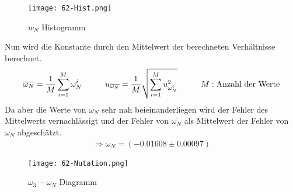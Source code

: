 \begin{figure}[ht]
    \centering
    \caption{$w_N$ Histogramm}
    \texttt{[image: 62-Hist.png]}
\end{figure}
Nun wird die Konstante durch den Mittelwert der berechneten Verhältnisse berechnet.
\begin{align}   
    \overline{\omega_N} = \frac{1}{M}\sum_{i=1}^{M}\omega_N^i \tab u_{\overline{\omega_N}}= \frac{1}{M}\sqrt{\sum_{i=1}^{M}u_{\omega_N^i}^2} \tab M:\text{Anzahl der Werte}
\end{align}
Da aber die Werte von $\omega_N$ sehr nah beieinanderliegen wird der Fehler des Mittelwerts vernachlässigt und der Fehler von $\overline{\omega_N}$ als Mittelwert der Fehler von $\omega_N$ abgeschätzt.
\begin{align*}
    \Rightarrow\boxed{\overline{\omega_N}=(-0.01608\pm0.00097)}
\end{align*}
\newpage
\begin{figure}[ht]
    \centering
    \caption{$\omega_3-\omega_N$ Diagramm}
    \texttt{[image: 62-Nutation.png]}
\end{figure}